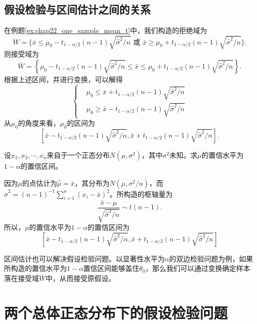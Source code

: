\subsection{假设检验与区间估计之间的关系}
在例题\ref{ex:chap22_one_sample_mean_t}中，我们构造的拒绝域为
 $$
     W = \{\bar{x} \leq \mu_0 - t_{1-\alpha/2}(n-1)\sqrt{\hat{\sigma}^2/n} \text{ 或 }  \bar{x} \geq \mu_0 + t_{1-\alpha/2}(n-1)\sqrt{\hat{\sigma}^2/n}\}.
    $$
则接受域为
$$
\overline{W} = \left\{  \mu_0 - t_{1-\alpha/2}(n-1)\sqrt{\hat{\sigma}^2/n} \leq \bar{x} \leq \mu_0 + t_{1-\alpha/2}(n-1)\sqrt{\hat{\sigma}^2/n} \right\}.
$$
根据上述区间，并进行变换，可以解得
$$
\left\{
\begin{aligned}
    & \mu_0 \leq \bar{x}  + t_{1-\alpha/2}(n-1)\sqrt{\hat{\sigma}^2/n} \\
    & \mu_0 \geq \bar{x}  - t_{1-\alpha/2}(n-1)\sqrt{\hat{\sigma}^2/n} 
\end{aligned}
\right.
$$
从$\mu_0$的角度来看，$\mu_0$的区间为
$$
[\bar{x}  - t_{1-\alpha/2}(n-1)\sqrt{\hat{\sigma}^2/n},\bar{x}  + t_{1-\alpha/2}(n-1)\sqrt{\hat{\sigma}^2/n}].
$$
\begin{example}
    设$x_1,x_2,\cdots,x_n$来自于一个正态分布$N(\mu,\sigma^2)$，其中$\sigma^2$未知。求$\mu$的置信水平为$1-\alpha$的置信区间。
\end{example}
\begin{solution}
因为$\mu$的点估计为$\hat{\mu} = \bar{x}$，其分布为$N(\mu,\sigma^2/n)$，而$\hat{\sigma}^2 = (n-1)^{-1}\sum_{i=1}^n (x_i-\bar{x})^2$。所构造的枢轴量为
$$
\frac{\bar{x} - \mu}{\sqrt{\hat{\sigma}^2/n}} \sim t(n-1).
$$
所以，$\mu$的置信水平为$1-\alpha$的置信区间为
$$
[\bar{x}  - t_{1-\alpha/2}(n-1)\sqrt{\hat{\sigma}^2/n},\bar{x}  + t_{1-\alpha/2}(n-1)\sqrt{\hat{\sigma}^2/n}]
$$
\end{solution}
\begin{remark}
    区间估计也可以解决假设检验问题。以显著性水平为$\alpha$的双边检验问题为例，如果所构造的置信水平为$1-\alpha$置信区间能够盖住$\theta_0$，那么我们可以通过变换确定样本落在接受域$\overline{W}$中，从而接受原假设。
\end{remark}

\section{两个总体正态分布下的假设检验问题}
